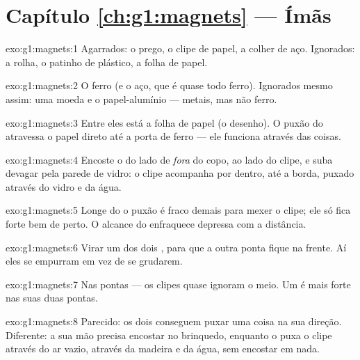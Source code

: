 \section*{Capítulo \ref{ch:g1:magnets} --- Ímãs}

\begin{solution}{exo:g1:magnets:1}
Agarrados: o prego, o clipe de papel, a colher de aço. Ignorados: a
rolha, o patinho de plástico, a folha de papel.
\end{solution}

\begin{solution}{exo:g1:magnets:2}
O ferro (e o aço, que é quase todo ferro). Ignorados mesmo assim: uma
moeda e o papel-alumínio --- metais, mas não ferro.
\end{solution}

\begin{solution}{exo:g1:magnets:3}
Entre eles está a folha de papel (o desenho). O puxão do 
atravessa o papel direto até a porta de ferro --- ele funciona
através das coisas.
\end{solution}

\begin{solution}{exo:g1:magnets:4}
Encoste o  do lado de \emph{fora} do copo, ao lado do clipe, e
suba devagar pela parede de vidro: o clipe acompanha por dentro, até
a borda, puxado através do vidro e da água.
\end{solution}

\begin{solution}{exo:g1:magnets:5}
Longe do  o puxão é fraco demais para mexer o clipe; ele só fica
forte bem de perto. O alcance do  enfraquece depressa com a
distância.
\end{solution}

\begin{solution}{exo:g1:magnets:6}
Virar um dos dois , para que a outra ponta fique na frente. Aí
eles se empurram em vez de se grudarem.
\end{solution}

\begin{solution}{exo:g1:magnets:7}
Nas pontas --- os clipes quase ignoram o meio. Um  é mais forte
nas suas duas pontas.
\end{solution}

\begin{solution}{exo:g1:magnets:8}
Parecido: os dois conseguem puxar uma coisa na sua direção.
Diferente: a sua mão precisa encostar no brinquedo, enquanto o 
puxa o clipe através do ar vazio, através da madeira e da água, sem
encostar em nada.
\end{solution}


